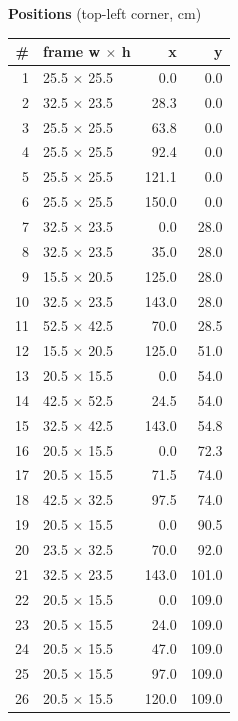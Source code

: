 \documentclass[a4paper,landscape,10pt]{article}
\begin{document}
\begin{minipage}[t]{0.25\textwidth}
\vspace{8pt}
{\bfseries Positions} (top-left corner, cm)\\[2pt]
\tiny
\begin{tabular}{@{}r l r r@{}}
\toprule
\# & frame w $\times$ h & x & y \\
\midrule
1 & 25.5 $\times$ 25.5 & 0.0 & 0.0 \\
2 & 32.5 $\times$ 23.5 & 28.3 & 0.0 \\
3 & 25.5 $\times$ 25.5 & 63.8 & 0.0 \\
4 & 25.5 $\times$ 25.5 & 92.4 & 0.0 \\
5 & 25.5 $\times$ 25.5 & 121.1 & 0.0 \\
6 & 25.5 $\times$ 25.5 & 150.0 & 0.0 \\
7 & 32.5 $\times$ 23.5 & 0.0 & 28.0 \\
8 & 32.5 $\times$ 23.5 & 35.0 & 28.0 \\
9 & 15.5 $\times$ 20.5 & 125.0 & 28.0 \\
10 & 32.5 $\times$ 23.5 & 143.0 & 28.0 \\
11 & 52.5 $\times$ 42.5 & 70.0 & 28.5 \\
12 & 15.5 $\times$ 20.5 & 125.0 & 51.0 \\
13 & 20.5 $\times$ 15.5 & 0.0 & 54.0 \\
14 & 42.5 $\times$ 52.5 & 24.5 & 54.0 \\
15 & 32.5 $\times$ 42.5 & 143.0 & 54.8 \\
16 & 20.5 $\times$ 15.5 & 0.0 & 72.3 \\
17 & 20.5 $\times$ 15.5 & 71.5 & 74.0 \\
18 & 42.5 $\times$ 32.5 & 97.5 & 74.0 \\
19 & 20.5 $\times$ 15.5 & 0.0 & 90.5 \\
20 & 23.5 $\times$ 32.5 & 70.0 & 92.0 \\
21 & 32.5 $\times$ 23.5 & 143.0 & 101.0 \\
22 & 20.5 $\times$ 15.5 & 0.0 & 109.0 \\
23 & 20.5 $\times$ 15.5 & 24.0 & 109.0 \\
24 & 20.5 $\times$ 15.5 & 47.0 & 109.0 \\
25 & 20.5 $\times$ 15.5 & 97.0 & 109.0 \\
26 & 20.5 $\times$ 15.5 & 120.0 & 109.0 \\
\bottomrule
\end{tabular}
\end{minipage}
\clearpage
\end{document}

